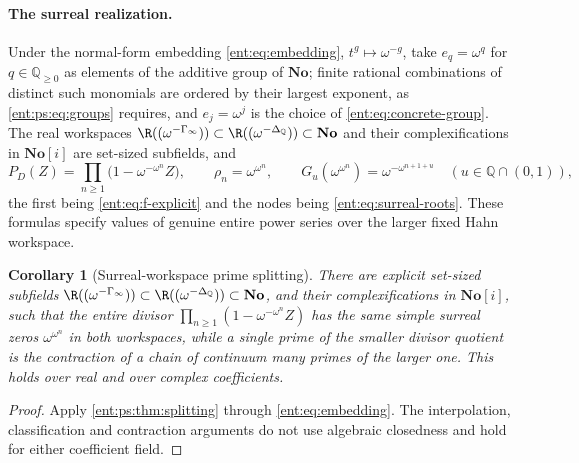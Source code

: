 \documentclass[11pt]{article}
\theoremstyle{plain}
\theoremstyle{plain}
\theoremstyle{plain}
\newtheorem{corollary}[corollary]{Corollary}
\theoremstyle{definition}
\theoremstyle{definition}
\theoremstyle{definition}
\theoremstyle{definition}
\theoremstyle{remark}
\newcommand{\Q}{\mathbb Q}\newcommand{\Z}{\mathbb Z}\newcommand{\N}{\mathbb N}
\newcommand{\No}{\mathbf{No}}
\begin{document}
\paragraph{The surreal realization.}
Under the normal-form embedding \eqref{ent:eq:embedding},
$t^g\mapsto\omega^{-g}$, take $e_q=\omega^q$ for $q\in\Q_{\ge0}$ as elements
of the additive group of $\No$; finite rational combinations of distinct
such monomials are ordered by their largest exponent, as
\eqref{ent:ps:eq:groups} requires, and $e_j=\omega^j$ is the choice of
\eqref{ent:eq:concrete-group}. The real workspaces
$\R((\omega^{-\Gamma_\infty}))\subset\R((\omega^{-\Delta_\Q}))\subset\No$ and
their complexifications in $\No[i]$ are set-sized subfields, and
\[
 P_D(Z)=\prod_{n\ge1}\bigl(1-\omega^{-\omega^n}Z\bigr),\qquad
 \rho_n=\omega^{\omega^n},\qquad
 G_u(\omega^{\omega^n})=\omega^{-\omega^{n+1+u}}\quad(u\in\Q\cap(0,1)),
\]
the first being \eqref{ent:eq:f-explicit} and the nodes being
\eqref{ent:eq:surreal-roots}. These formulas specify values of genuine entire
power series over the larger fixed Hahn workspace.

\begin{corollary}[Surreal-workspace prime splitting]
\label{ent:ps:cor:surreal-splitting}
There are explicit set-sized subfields
$\R((\omega^{-\Gamma_\infty}))\subset\R((\omega^{-\Delta_\Q}))\subset\No$, and
their complexifications in $\No[i]$, such that the entire divisor
$\prod_{n\ge1}(1-\omega^{-\omega^n}Z)$ has the same simple surreal zeros
$\omega^{\omega^n}$ in both workspaces, while a single prime of the smaller
divisor quotient is the contraction of a chain of continuum many primes of
the larger one. This holds over real and over complex coefficients.
\end{corollary}
\begin{proof}
Apply \cref{ent:ps:thm:splitting} through \eqref{ent:eq:embedding}. The
interpolation, classification and contraction arguments do not use
algebraic closedness and hold for either coefficient field.
\end{proof}
\end{document}
